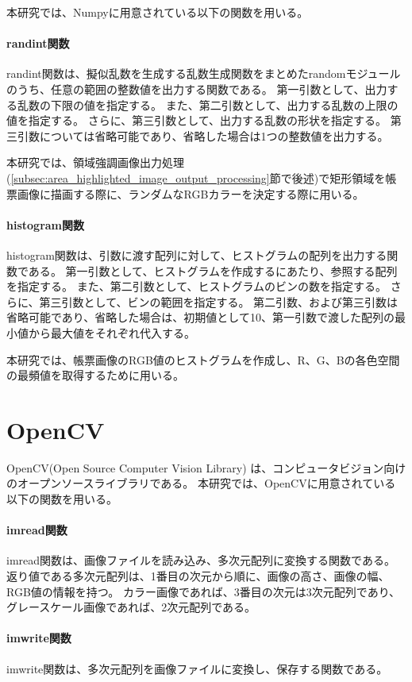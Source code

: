 本研究では、Numpyに用意されている以下の関数を用いる。

\paragraph{randint関数}
randint関数は、擬似乱数を生成する乱数生成関数をまとめたrandomモジュールのうち、任意の範囲の整数値を出力する関数である\cite{randint関数}。
第一引数として、出力する乱数の下限の値を指定する。
また、第二引数として、出力する乱数の上限の値を指定する。
さらに、第三引数として、出力する乱数の形状を指定する。
第三引数については省略可能であり、省略した場合は1つの整数値を出力する。

本研究では、領域強調画像出力処理(\ref{subsec:area_highlighted_image_output_processing}節で後述)で矩形領域を帳票画像に描画する際に、ランダムなRGBカラーを決定する際に用いる。

\paragraph{histogram関数}
histogram関数は、引数に渡す配列に対して、ヒストグラムの配列を出力する関数である\cite{histogram関数}。
第一引数として、ヒストグラムを作成するにあたり、参照する配列を指定する。
また、第二引数として、ヒストグラムのビンの数を指定する。
さらに、第三引数として、ビンの範囲を指定する。
第二引数、および第三引数は省略可能であり、省略した場合は、初期値として10、第一引数で渡した配列の最小値から最大値をそれぞれ代入する。

本研究では、帳票画像のRGB値のヒストグラムを作成し、R、G、Bの各色空間の最頻値を取得するために用いる。

\section{OpenCV}\label{sec:OpenCV}
OpenCV(Open Source Computer Vision Library) は、コンピュータビジョン向けのオープンソースライブラリである\cite{OpenCV}。
本研究では、OpenCVに用意されている以下の関数を用いる。

\paragraph{imread関数}
imread関数は、画像ファイルを読み込み、多次元配列に変換する関数である\cite{imread関数}。
返り値である多次元配列は、1番目の次元から順に、画像の高さ、画像の幅、RGB値の情報を持つ。
カラー画像であれば、3番目の次元は3次元配列であり、グレースケール画像であれば、2次元配列である。

\paragraph{imwrite関数}
imwrite関数は、多次元配列を画像ファイルに変換し、保存する関数である。

